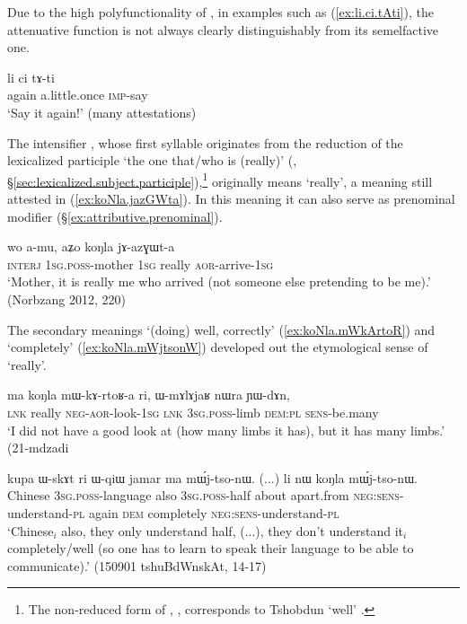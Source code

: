  Due to the high polyfunctionality of , in examples such as  (\ref{ex:li.ci.tAti}), the attenuative function is not always clearly distinguishably from its semelfactive one. 
 
 \begin{exe}
\ex \label{ex:li.ci.tAti}
\gll li ci tɤ-ti \\
again a.little.once \textsc{imp}-say \\
\glt `Say it again!' (many attestations)
 \end{exe} 
  
The intensifier , whose first syllable originates from the reduction of the lexicalized participle  `the one that/who is (really)' (, §\ref{sec:lexicalized.subject.participle}),\footnote{The non-reduced form of , , corresponds to Tshobdun  `well' \citep[55]{jackson19tshobdun}. } originally means `really', a meaning still attested in (\ref{ex:koNla.jazGWta}). In this meaning it can also serve as prenominal modifier (§\ref{ex:attributive.prenominal}).

 \begin{exe}
\ex \label{ex:koNla.jazGWta}
\gll   wo a-mu, aʑo koŋla jɤ-azɣɯt-a \\
\textsc{interj} \textsc{1sg}.\textsc{poss}-mother \textsc{1sg} really \textsc{aor}-arrive-\textsc{1sg} \\
\glt `Mother, it is really me who arrived (not someone else pretending to be me).' (Norbzang 2012, 220)
 \end{exe} 
 
The secondary meanings `(doing) well, correctly' (\ref{ex:koNla.mWkArtoR}) and `completely' (\ref {ex:koNla.mWjtsonW})  developed out the etymological sense of `really'.
 
 \begin{exe}
\ex \label{ex:koNla.mWkArtoR}
\gll ma koŋla mɯ-kɤ-rtoʁ-a ri, ɯ-mɤlɤjaʁ nɯra ɲɯ-dɤn, \\
\textsc{lnk} really \textsc{neg}-\textsc{aor}-look-\textsc{1sg} \textsc{lnk} \textsc{3sg}.\textsc{poss}-limb \textsc{dem}:\textsc{pl} \textsc{sens}-be.many \\
\glt `I did not have a good look at (how many limbs it has), but it has many limbs.' (21-mdzadi
 \end{exe} 
 
 
\begin{exe}
\ex \label{ex:koNla.mWjtsonW}
\gll kupa ɯ-skɤt ri ɯ-qiɯ jamar ma mɯ́j-tso-nɯ. (...) li nɯ koŋla mɯ́j-tso-nɯ. \\
Chinese \textsc{3sg}.\textsc{poss}-language also \textsc{3sg}.\textsc{poss}-half about apart.from \textsc{neg}:\textsc{sens}-understand-\textsc{pl} {  } again \textsc{dem} completely \textsc{neg}:\textsc{sens}-understand-\textsc{pl} \\
\glt `Chinese$_i$  also, they only understand half, (...), they don't understand it$_i$ completely/well (so one has to learn to speak their language to be able to communicate).' (150901 tshuBdWnskAt, 14-17)
\end{exe} 

